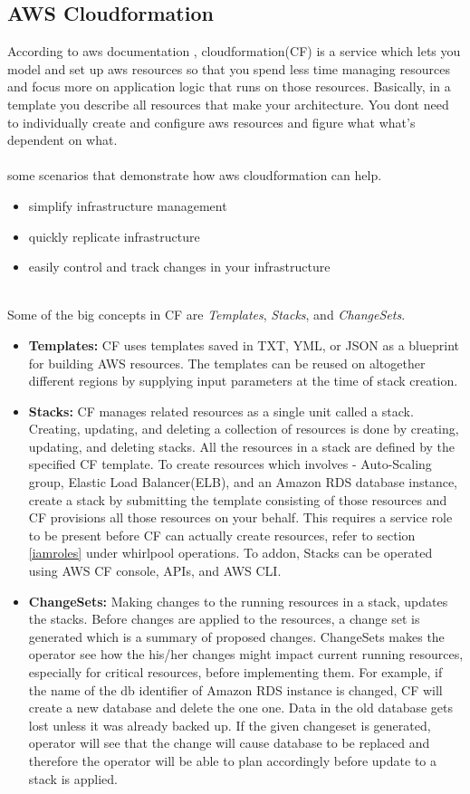 \subsection{AWS Cloudformation}
According to aws documentation \cite{docker}, cloudformation(CF) is a service which lets you model and set up aws resources so that you spend less time managing resources and focus more on application logic that runs on those resources. Basically, in a template you describe all resources that make your architecture. You
dont need to individually create and configure aws resources and figure what what's dependent on what.
\\
\\
some scenarios that demonstrate how aws cloudformation can help.
\begin{itemize}
    \item simplify infrastructure management
    \item quickly replicate infrastructure
    \item easily control and track changes in your infrastructure
\end{itemize}
\\
Some of the big concepts in CF are \textit{Templates}, \textit{Stacks}, and \textit{ChangeSets}.
\begin{itemize}
\item \textbf{Templates:} CF uses templates saved in TXT, YML, or JSON as a blueprint for building AWS
  resources. The templates can be reused on altogether different regions by supplying input parameters at the time of stack creation.
\item \textbf{Stacks:} CF manages related resources as a single unit called a stack. Creating, updating,
  and deleting a collection of resources is done by creating, updating, and deleting stacks. All the
  resources in a stack are defined by the specified CF template. To create resources which involves 
  - Auto-Scaling group, Elastic Load Balancer(ELB), and an Amazon RDS database instance, create a stack by
  submitting the template consisting of those resources and CF provisions all those resources on your
  behalf. This requires a service role to be present before CF can actually create resources, refer to
  section \ref{iamroles} under whirlpool operations. To addon, Stacks can be operated using AWS CF console, APIs, and AWS CLI.
\item \textbf{ChangeSets:} Making changes to the running resources in a stack, updates the stacks. Before
  changes are applied to the resources, a change set is generated which is a summary of proposed changes.
  ChangeSets makes the operator see how the his/her changes might impact current running resources,
  especially for critical resources, before implementing them. For example, if the name of the db
  identifier of Amazon RDS instance is changed, CF will create a new database and delete the one one.
  Data in the old database gets lost unless it was already backed up. If the given changeset is generated,
  operator will see that the change will cause database to be replaced and therefore the operator will be
  able to plan accordingly before update to a stack is applied.
\end{itemize}

